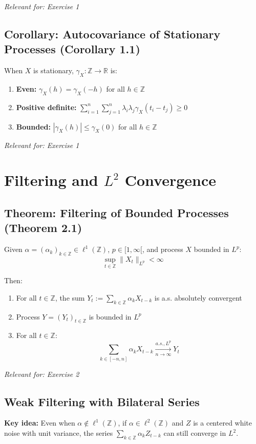 \documentclass[a4paper, 12pt]{article}
\begin{document}
\textit{Relevant for: Exercise 1}

\subsection{Corollary: Autocovariance of Stationary Processes (Corollary 1.1)}
When $X$ is stationary, $\gamma_X: \mathbb{Z} \to \mathbb{R}$ is:
\begin{enumerate}
\item \textbf{Even:} $\gamma_X(h) = \gamma_X(-h)$ for all $h \in \mathbb{Z}$
\item \textbf{Positive definite:} $\sum_{i=1}^n \sum_{j=1}^n \lambda_i\lambda_j\gamma_X(t_i-t_j) \geq 0$
\item \textbf{Bounded:} $|\gamma_X(h)| \leq \gamma_X(0)$ for all $h \in \mathbb{Z}$
\end{enumerate}

\textit{Relevant for: Exercise 1}

\section{Filtering and $L^2$ Convergence}

\subsection{Theorem: Filtering of Bounded Processes (Theorem 2.1)}
Given $\alpha = (\alpha_k)_{k \in \mathbb{Z}} \in \ell^1(\mathbb{Z})$, $p \in [1,\infty[$, and process $X$ bounded in $L^p$:
\[
\sup_{t \in \mathbb{Z}} \|X_t\|_{L^p} < \infty
\]

Then:
\begin{enumerate}
\item For all $t \in \mathbb{Z}$, the sum $Y_t := \sum_{k \in \mathbb{Z}} \alpha_k X_{t-k}$ is a.s. absolutely convergent
\item Process $Y = (Y_t)_{t \in \mathbb{Z}}$ is bounded in $L^p$
\item For all $t \in \mathbb{Z}$:
\[
\sum_{k \in [-n,n]} \alpha_k X_{t-k} \xrightarrow[n \to \infty]{a.s., L^p} Y_t
\]
\end{enumerate}

\textit{Relevant for: Exercise 2}

\subsection{Weak Filtering with Bilateral Series}
\textbf{Key idea:} Even when $\alpha \notin \ell^1(\mathbb{Z})$, if $\alpha \in \ell^2(\mathbb{Z})$ and $Z$ is a centered white noise with unit variance, the series $\sum_{k \in \mathbb{Z}} \alpha_k Z_{t-k}$ can still converge in $L^2$.
\end{document}
